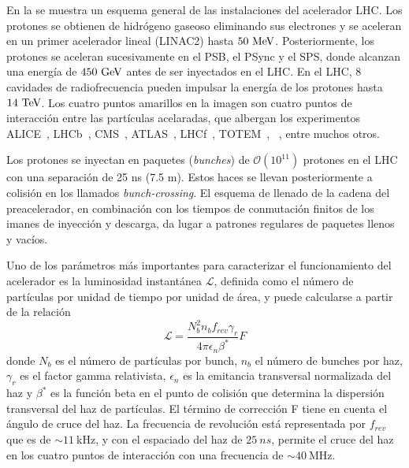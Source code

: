 En la \Fig{\ref{fig:atlas:lhc:lhc}} se muestra un esquema general de las instalaciones del acelerador \ac{LHC}. Los protones se obtienen de hidrógeno gaseoso eliminando sus electrones y se aceleran en un primer acelerador lineal (LINAC2) hasta \(50~\text{MeV}\). Posteriormente, los protones se aceleran sucesivamente en el \ac{PSB}, el \ac{PSync} y el \ac{SPS}, donde alcanzan una energía de \(450~\text{GeV}\) antes de ser inyectados en el \ac{LHC}. En el \ac{LHC}, 8 cavidades de radiofrecuencia pueden impulsar la energía de los protones hasta \(14~\text{TeV}\). Los cuatro puntos amarillos en la imagen \Fig{\ref{fig:atlas:lhc:lhc}} son cuatro puntos de interacción entre las partículas acelaradas, que albergan los experimentos \acs{ALICE}~\cite{ALICE}, \acs{LHCb}~\cite{LHCb}, \acs{CMS}~\cite{CMS}, \acs{ATLAS}~\cite{ATLAS}, \acs{LHCf}~\cite{LHCf}, \acs{TOTEM}~\cite{TOTEM}, ~\cite{MoEDAL}, entre muchos otros.

Los protones se inyectan en paquetes (\textit{bunches}) de \(\mathcal{O}(10^{11})\) protones en el \ac{LHC} con una separación de 25 ns (7.5 m). Estos haces se llevan posteriormente a colisión en los llamados \textit{bunch-crossing}. El esquema de llenado de la cadena del preacelerador, en combinación con los tiempos de conmutación finitos de los imanes de inyección y descarga, da lugar a patrones regulares de paquetes llenos y vacíos.




Uno de los parámetros más importantes para caracterizar el funcionamiento del acelerador es la luminosidad instantánea \(\mathcal{L}\), definida como el número de partículas por unidad de tiempo por unidad de área, y puede calcularse a partir de la relación
\begin{equation}
    \mathcal{L} = \frac{N_b^ 2n_b f_{rev}\gamma_r}{4\pi\epsilon_n\beta^*}F
    \label{eq:atlas:LHC:instantaneous_lumi}
\end{equation}
donde $N_b$ es el número de partículas por bunch, $n_b$ el número de bunches por haz, $\gamma_r$ es el factor gamma relativista, $\epsilon_n$ es la emitancia transversal normalizada del haz y $\beta^*$ es la función beta en el punto de colisión que determina la dispersión transversal del haz de partículas. El término de corrección F tiene en cuenta el ángulo de cruce del haz. La frecuencia de revolución está representada por $f_{rev}$ que es de \(\sim 11~\)kHz, y con el espaciado del haz de \(25~ns\), permite el cruce del haz en los cuatro puntos de interacción con una frecuencia de \(\sim 40~\)MHz.

